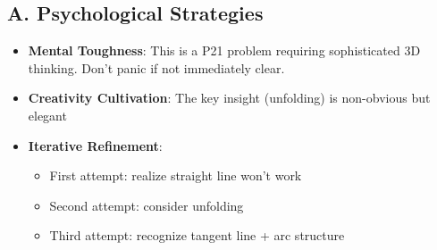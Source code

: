 \documentclass[12pt]{article}
\begin{document}
\begin{strategicbox}
\subsection*{A. Psychological Strategies}
\begin{itemize}[leftmargin=*]
    \item \textbf{Mental Toughness}: This is a P21 problem requiring sophisticated 3D thinking. Don't panic if not immediately clear.
    \item \textbf{Creativity Cultivation}: The key insight (unfolding) is non-obvious but elegant
    \item \textbf{Iterative Refinement}: 
    \begin{itemize}
        \item First attempt: realize straight line won't work
        \item Second attempt: consider unfolding
        \item Third attempt: recognize tangent line + arc structure
    \end{itemize}
\end{itemize}


\end{strategicbox}
\end{document}

